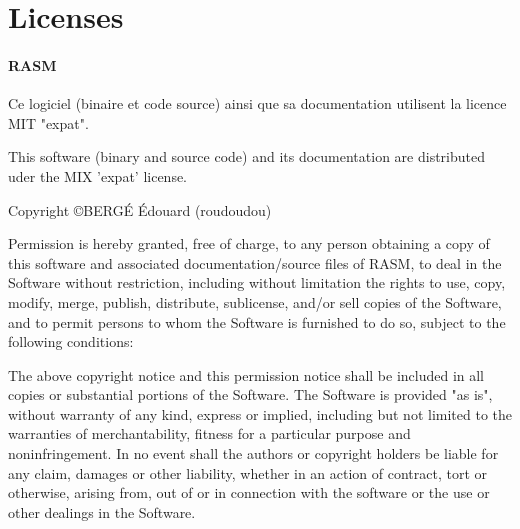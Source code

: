 \section{Licenses} \label{licenses}

\paragraph{RASM}

\begin{xfr}
Ce logiciel (binaire et code source) ainsi que sa documentation utilisent la licence MIT "expat".
\end{xfr}

\begin{xen}
This software (binary and source code) and its documentation are distributed uder the MIX 'expat' license.
\end{xen}

Copyright \copyright BERG\'E \'Edouard (roudoudou)

\begin{ttfamily}

Permission is hereby granted, free of charge, to any person obtaining a
copy of this software and associated documentation/source files of RASM,
to deal in the Software without restriction, including without limitation
the rights to use, copy, modify, merge, publish, distribute, sublicense,
and/or sell copies of the Software, and to permit persons to whom the
Software is furnished to do so, subject to the following conditions:

The above copyright notice and this permission notice shall be included
in all copies or substantial portions of the Software. The Software is
provided "as is", without warranty of any kind, express or implied,
including but not limited to the warranties of merchantability, fitness
for a particular purpose and noninfringement. In no event shall the authors
or copyright holders be liable for any claim, damages or other liability,
whether in an action of contract, tort or otherwise, arising from, out of or
in connection with the software or the use or other dealings in the Software.
\end{ttfamily}

